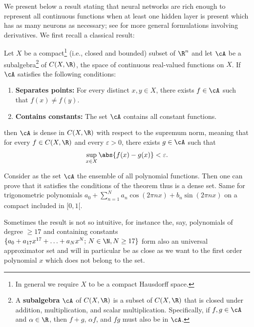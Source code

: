 We present below a result stating that neural networks are rich enough to represent all continuous functions when at least one hidden layer is present which has as many neurons as necessary; see \cite{turinici14} for more general formulations involving derivatives. We first recall a classical result:

\begin{theorem}\label{thm:ch7-stone-weierstrass}
Let $X$ be a compact\footnote{In general we require $X$ to be a compact Hausdorff space.} (i.e., closed and bounded) subset of $\R^n$ and let $\cA$ be a subalgebra\footnote{A \textbf{subalgebra} $\cA$ of $C(X, \R)$ is a subset of $C(X, \R)$ that is closed under addition, multiplication, and scalar multiplication. Specifically, if $f, g \in \cA$ and $\alpha \in \R$, then $f + g$, $\alpha f$, and $fg$ must also be in $\cA$.} of $C(X, \R)$, the space of continuous real-valued functions on $X$. If $\cA$ satisfies the following conditions:
\begin{enumerate}
  \item \textbf{Separates points:} For every distinct $x, y \in X$, there exists $f \in \cA$ such that $f(x) \neq f(y)$.
  \item \textbf{Contains constants:} The set $\cA$ contains all constant functions.
\end{enumerate}
then $\cA$ is dense in $C(X, \R)$ with respect to the supremum norm, meaning that for every $f \in C(X, \R)$ and every $\varepsilon > 0$, there exists $g \in \cA$ such that
\[
  \sup_{x \in X} \abs{f(x) - g(x)} < \varepsilon.
\]
\end{theorem}

\begin{example}\label{ex:ch7-polynomials}
Consider as the set $\cA$ the ensemble of all polynomial functions. Then one can prove that it satisfies the conditions of the theorem thus is a dense set. Same for trigonometric polynomials $a_0 + \sum_{n=1}^{N} a_n \cos(2\pi n x) + b_n \sin(2\pi n x)$ on a compact included in $[0, 1[$.

Sometimes the result is not so intuitive, for instance the, say, polynomials of degree $\geq 17$ and containing constants $\{a_0 + a_{17} x^{17} + \ldots + a_N x^N;\, N \in \N, N \geq 17\}$ form also an universal approximator set and will in particular be as close as we want to the first order polynomial $x$ which does not belong to the set.
\end{example}

